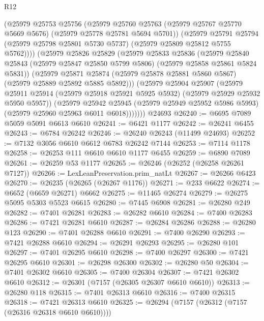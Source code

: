 \begin{lexlean}{R12}
\begin{coremodule}
{{{{{{{{{{{{{{{{{{{{{{{{{{{{{{{{{{{{{{{{{{{{{{{{{{{{{{{{{{{{{{{{{{{{{{{{{{{{{{{{{{            (@25979
              @25753
              @25756
              (@25979
                @25760
                @25763
                (@25979 @25767 @25770 @5669 @5676)
                (@25979 @25778 @25781 @5694 @5701))
              (@25979
                @25791
                @25794
                (@25979 @25798 @25801 @5730 @5737)
                (@25979 @25809 @25812 @5755 @5762))))
          (@25979
            @25826
            @25829
            (@25979
              @25833
              @25836
              (@25979
                @25840
                @25843
                (@25979 @25847 @25850 @5799 @5806)
                (@25979 @25858 @25861 @5824 @5831))
              (@25979
                @25871
                @25874
                (@25979 @25878 @25881 @5860 @5867)
                (@25979 @25889 @25892 @5885 @5892)))
            (@25979
              @25904
              @25907
              (@25979
                @25911
                @25914
                (@25979 @25918 @25921 @5925 @5932)
                (@25979 @25929 @25932 @5950 @5957))
              (@25979
                @25942
                @25945
                (@25979 @25949 @25952 @5986 @5993)
                (@25979 @25960 @25963 @6011 @6018)))))))
    @24693
@26240 := @6695 @7089 @5059 @5091 @6613 @6610
@26241 := @6421 @1177
@26242 := @26241 @6455
@26243 := @6784 @26242
@26246 := @26240 @26243 (@11499 @24693)
@26252 := @7132 @3056 @6610 @6612 @6783 @26242 @7144
@26253 := @7114 @1178
@26258 := @26253 @111 @6610 @6610 @1177 @6455
@26259 := @6890 @7089
@26261 := @26259 @53 @1177
@26265 := @26246 (@26252 (@26258 @26261 @7127))
@26266 := LexLeanPreservation.prim_natLt
@26267 := @26266 @6423
@26270 := @26235 (@26265 (@26267 @1176))
@26271 := @233 @6622
@26274 := @6652 (@6659 @26271) @6662
@26275 := @11465 @26274
@26279 := @26275 @5095 @5303 @5523 @6615
@26280 := @7445 @6908
@26281 := @26280 @249
@26282 := @7401 @26281
@26283 := @26282 @6610
@26284 := @7400 @26283
@26286 := @7421 @26281 @6610
@26287 := @26284 @26286
@26288 := @26280 @123
@26290 := @7401 @26288 @6610
@26291 := @7400 @26290
@26293 := @7421 @26288 @6610
@26294 := @26291 @26293
@26295 := @26280 @101
@26297 := @7401 @26295 @6610
@26298 := @7400 @26297
@26300 := @7421 @26295 @6610
@26301 := @26298 @26300
@26302 := @26280 @50
@26304 := @7401 @26302 @6610
@26305 := @7400 @26304
@26307 := @7421 @26302 @6610
@26312 := @26301 (@7157 (@26305 @26307 @6610 @6610))
@26313 := @26280 @118
@26315 := @7401 @26313 @6610
@26316 := @7400 @26315
@26318 := @7421 @26313 @6610
@26325 := @26294 (@7157 (@26312 (@7157 (@26316 @26318 @6610 @6610))))
}}}}}}}}}}}}}}}}}}}}}}}}}}}}}}}}}}}}}}}}}}}}}}}}}}}}}}}}}}}}}}}}}}}}}}}}}}}}}}}}}}
\end{coremodule}
\end{lexlean}
